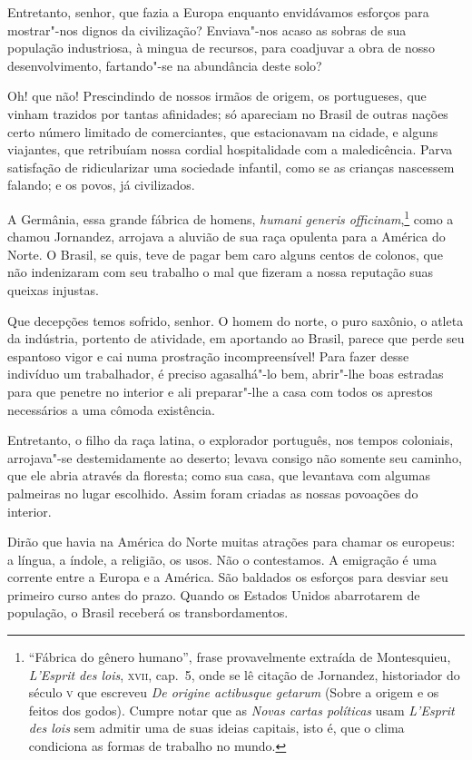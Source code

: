 \begin{linenumbers}
 Entretanto, senhor, que fazia a Europa enquanto envidávamos esforços
para mostrar"-nos dignos da civilização? Enviava"-nos acaso as sobras
de sua população industriosa, à mingua de recursos, para coadjuvar a
obra de nosso desenvolvimento, fartando"-se na abundância deste solo?

 Oh! que não! Prescindindo de nossos irmãos de origem, os portugueses,
que vinham trazidos por tantas afinidades; só apareciam no Brasil de
outras nações certo número limitado de comerciantes, que estacionavam
na cidade, e alguns viajantes, que retribuíam nossa cordial
hospitalidade com a maledicência. Parva satisfação de ridicularizar uma
sociedade infantil, como se as crianças nascessem falando; e os povos, já civilizados. 

A Germânia, essa grande fábrica de homens, \textit{humani generis
officinam},\footnote{ ``Fábrica do gênero humano'', frase provavelmente extraída de Montesquieu, 
\textit{L'Esprit des lois}, \textsc{xvii}, cap.~5, onde se lê citação de Jornandez, historiador do século \textsc{v} 
que escreveu \textit{De origine actibusque getarum} (Sobre a origem e os feitos dos godos). Cumpre notar que 
as \textit{Novas cartas políticas} usam \textit{L'Esprit des lois} sem admitir uma de suas ideias capitais, isto é, que o clima 
condiciona as formas de trabalho no mundo.} como a chamou Jornandez, arrojava a aluvião de sua 
raça opulenta para a América do Norte. O Brasil, se quis, teve de pagar bem caro alguns centos de colonos, que
não indenizaram com seu trabalho o mal que fizeram a nossa reputação suas queixas injustas.

 Que decepções temos sofrido, senhor. O homem do norte, o puro saxônio,
o atleta da indústria, portento de atividade, em aportando ao Brasil,
parece que perde seu espantoso vigor e cai numa prostração
incompreensível! Para fazer desse indivíduo um trabalhador, é preciso
agasalhá"-lo bem, abrir"-lhe boas estradas para que penetre no
interior e ali preparar"-lhe a casa com todos os aprestos necessários
a uma cômoda existência. 

 Entretanto, o filho da raça latina, o explorador português, nos tempos
coloniais, arrojava"-se destemidamente ao deserto; levava consigo não
somente seu caminho, que ele abria através da floresta; como sua casa,
que levantava com algumas palmeiras no lugar escolhido. Assim foram
criadas as nossas povoações do interior. 

 Dirão que havia na América do Norte muitas atrações para chamar os
europeus: a língua, a índole, a religião, os usos. Não o contestamos. A
emigração é uma corrente entre a Europa e a América. São baldados os
esforços para desviar seu primeiro curso antes do prazo. Quando os
Estados Unidos abarrotarem de população, o Brasil receberá os
transbordamentos. 


\end{linenumbers}
